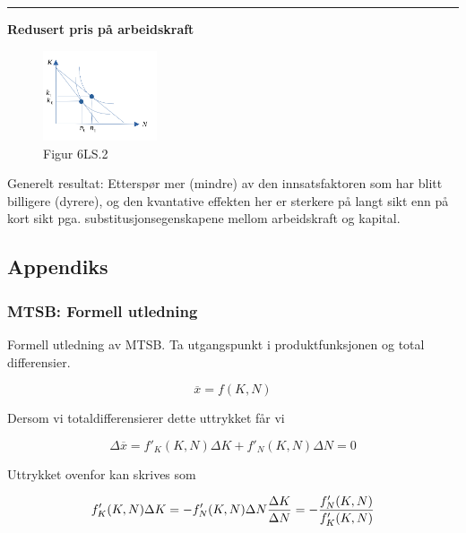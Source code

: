 \documentclass[
  letterpaper,
  DIV=11,
  numbers=noendperiod]{scrartcl}
\begin{document}
\begin{center}\rule{0.5\linewidth}{0.5pt}\end{center}

\textbf{Redusert pris på arbeidskraft}

\begin{figure}[H]

{\centering \includegraphics[width=0.3\textwidth,height=\textheight]{drawio/kosminka.png}

}

\caption{Figur 6LS.2}

\end{figure}%

Generelt resultat: Etterspør mer (mindre) av den innsatsfaktoren som har
blitt billigere (dyrere), og den kvantative effekten her er sterkere på
langt sikt enn på kort sikt pga. substitusjonsegenskapene mellom
arbeidskraft og kapital.

\subsection{Appendiks}\label{appendiks}

\subsubsection{MTSB: Formell utledning}\label{mtsb-formell-utledning}

Formell utledning av MTSB. Ta utgangspunkt i produktfunksjonen og total
differensier.

\[
\overline{x} = f(K,N)
\]

Dersom vi totaldifferensierer dette uttrykket får vi

\begin{equation*}
\Delta \overline{x} = f'_{K}(K,N)\Delta K + f'_{N}(K,N)\Delta N = 0 
\end{equation*}

Uttrykket ovenfor kan skrives som

\begin{equation*}
f'_{K}(K,N)\Delta K =- f'_{N}(K,N)\Delta N \\
\frac{\Delta K}{\Delta N} = - \frac{f'_{N}(K,N)}{f'_{K}(K,N)} 
\end{equation*}
\end{document}
